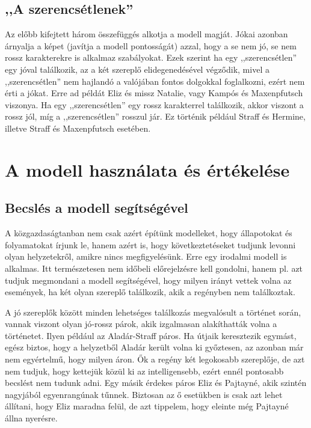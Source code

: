 \documentclass{thesis-ekf}
\begin{document}
    \section{,,A szerencsétlenek''}\label{sec_a-szerencsetlenek''}

    Az előbb kifejtett három összefüggés alkotja a modell magját.
    Jókai azonban árnyalja a képet (javítja a modell pontosságát) azzal, hogy a se nem jó, se nem rossz karakterekre is
        alkalmaz szabályokat.
    Ezek szerint ha egy ,,szerencsétlen'' egy jóval találkozik, az a két szereplő elidegenedésével végződik,
    mivel a ,,szerencsétlen'' nem hajlandó a valójában fontos dolgokkal foglalkozni, ezért nem érti a jókat.
    Erre ad példát Eliz és missz Natalie, vagy Kampós és Maxenpfutsch viszonya.
    Ha egy ,,szerencsétlen'' egy rossz karakterrel találkozik, akkor viszont a rossz jól,
        míg a ,,szerencsétlen'' rosszul jár.
    Ez történik például Straff és Hermine, illetve Straff és Maxenpfutsch esetében.

    \chapter{A modell használata és értékelése}

    \section{Becslés a modell segítségével}

    A közgazdaságtanban nem csak azért építünk modelleket, hogy állapotokat és folyamatokat írjunk le, hanem azért is,
        hogy következtetéseket tudjunk levonni olyan helyzetekről, amikre nincs megfigyelésünk.
    Erre egy irodalmi modell is alkalmas.
    Itt természetesen nem időbeli előrejelzésre kell gondolni, hanem pl. azt tudjuk megmondani a modell segítségével,
        hogy milyen irányt vettek volna az események, ha két olyan szereplő találkozik, akik a regényben nem találkoztak.

    A jó szereplők között minden lehetséges találkozás megvalósult a történet során, vannak viszont olyan jó‑rossz párok,
        akik izgalmasan alakíthatták volna a történetet.
    Ilyen például az Aladár-Straff páros.
    Ha útjaik keresztezik egymást, egész biztos, hogy a helyzetből Aladár került volna ki győztesen,
        az azonban már nem egyértelmű, hogy milyen áron.
    Ők a regény két legokosabb szereplője, de azt nem tudjuk, hogy kettejük közül ki az intelligensebb,
        ezért ennél pontosabb becslést nem tudunk adni.
    Egy másik érdekes páros Eliz és Pajtayné, akik szintén nagyjából egyenrangúnak tűnnek.
    Biztosan az ő esetükben is csak azt lehet állítani, hogy Eliz maradna felül, de azt tippelem, hogy eleinte még
        Pajtayné állna nyerésre.
\end{document}
